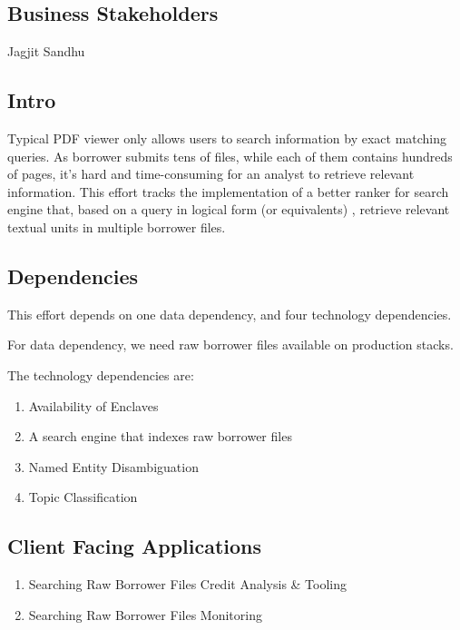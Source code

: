 \documentclass[]{article}
\begin{document}
\subsection{Business Stakeholders}
Jagjit Sandhu

\subsection{Intro}

Typical PDF viewer only allows users to search information by exact matching 
queries. As borrower submits tens of files, while each of them contains
hundreds of pages, it's hard and time-consuming for an analyst to retrieve 
relevant information. This effort tracks the implementation of a better ranker 
for search engine that, based on a query in logical form (or equivalents) 
\cite{may1985logical}, retrieve relevant textual units in multiple borrower 
files.

\subsection{Dependencies}
This effort depends on one data dependency, and four technology dependencies.

For data dependency, we need raw borrower files available on production stacks.

The technology dependencies are:

\begin{enumerate}
    \item Availability of Enclaves \cite{ppdp2019on}
    \item A search engine that indexes raw borrower files
    \item Named Entity Disambiguation
    \item Topic Classification
\end{enumerate}

\subsection{Client Facing Applications}
\begin{enumerate}
    \item Searching Raw Borrower Files \textrightarrow Credit Analysis \& 
    Tooling
    \item Searching Raw Borrower Files \textrightarrow Monitoring
\end{enumerate}

\newpage
\end{document}
